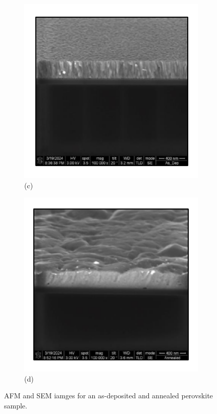 \begin{figure}[htbp]
    \vspace{1em} %

    \begin{subfigure}[t]{0.4\textwidth}
        \centering
        \includegraphics[width=\textwidth]{chapters/material_properties/images/SEM_Before.pdf} %
        \caption*{(c)}
    \end{subfigure}
    \hfill
    \begin{subfigure}[t]{0.4\textwidth}
        \centering
        \includegraphics[width=\textwidth]{chapters/material_properties/images/SEM_After.pdf} %
        \caption*{(d)}
    \end{subfigure}
    \caption{AFM and SEM iamges for an as-deposited and annealed perovskite sample.}
\end{figure}


